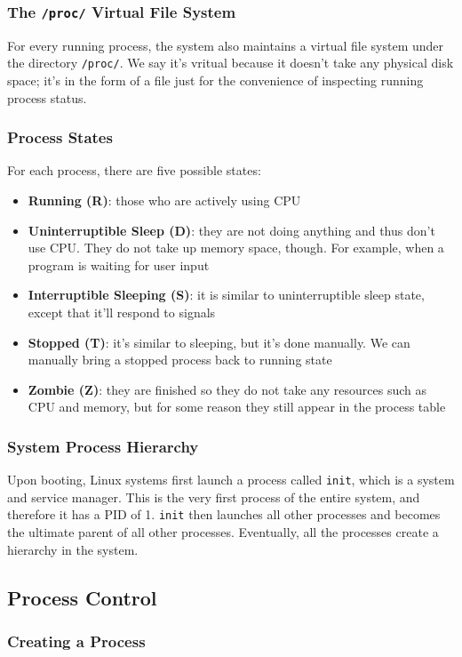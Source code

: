 \documentclass{article}
\newcommand{\bold}[1]{\textbf{#1}}
\renewcommand{\b}{\item[$\circ$]}
\newcommand{\newlist}{\begin{itemize}}
\renewcommand{\endlist}{\end{itemize}}
\newcommand{\code}[1]{\texttt{#1}}
\begin{document}
\subsubsection{The \code{/proc/} Virtual File System}

For every running process, the system also maintains a virtual file system under the directory \code{/proc/}. We say it's vritual because it doesn't take any physical disk space; it's in the form of a file just for the convenience of inspecting running process status. 

\subsubsection{Process States}

For each process, there are five possible states:

\newlist
\b \bold{Running (R)}: those who are actively using CPU
\b \bold{Uninterruptible Sleep (D)}: they are not doing anything and thus don't use CPU. They do not take up memory space, though. For example, when a program is waiting for user input
\b \bold{Interruptible Sleeping (S)}: it is similar to uninterruptible sleep state, except that it'll respond to signals
\b \bold{Stopped (T)}: it's similar to sleeping, but it's done manually. We can manually bring a stopped process back to running state
\b \bold{Zombie (Z)}: they are finished so they do not take any resources such as CPU and memory, but for some reason they still appear in the process table
\endlist

\subsubsection{System Process Hierarchy}

Upon booting, Linux systems first launch a process called \code{init}, which is a system and service manager. This is the very first process of the entire system, and therefore it has a PID of 1. \code{init} then launches all other processes and becomes the ultimate parent of all other processes. Eventually, all the processes create a hierarchy in the system. 

\subsection{Process Control}

\subsubsection{Creating a Process}
\end{document}
